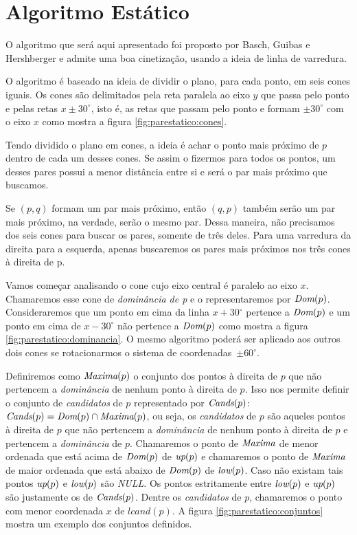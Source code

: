 
\FloatBarrier
\section{Algoritmo Estático}

O algoritmo que será aqui apresentado foi proposto por Basch, Guibas
e Hershberger e admite uma boa cinetização, usando a ideia de linha
de varredura.

O algoritmo é baseado na ideia de dividir o plano, para cada ponto,
em seis cones iguais. Os cones são delimitados pela reta paralela ao
eixo $y$ que passa pelo ponto e pelas retas $x \pm 30^\circ$, isto
é, as retas que passam pelo ponto e formam $\pm 30^\circ$ com o eixo
$x$ como mostra a figura \ref{fig:parestatico:cones}.



Tendo dividido o plano em cones, a ideia é achar o ponto mais
próximo de $p$ dentro de cada um desses cones. Se assim o fizermos
para todos os pontos, um desses pares possui a menor distância entre
si e será o par mais próximo que buscamos.

Se $(p, q)$ formam um par mais próximo, então $(q, p)$ também serão
um par mais próximo, na verdade, serão o mesmo par. Dessa maneira,
não precisamos dos seis cones para buscar os pares, somente de três
deles. Para uma varredura da direita para a esquerda, apenas
buscaremos os pares mais próximos nos três cones à direita de p.

Vamos começar analisando o cone cujo eixo central é paralelo ao eixo
$x$. Chamaremos esse cone de \textit{dominância de p} e o
representaremos por $\textit{Dom}(p)$. Consideraremos que um ponto em cima
da linha $x + 30^\circ$ pertence a $\textit{Dom}(p)$ e um ponto em cima de
$x - 30^\circ$ não pertence a $\textit{Dom}(p)$ como mostra a figura
\ref{fig:parestatico:dominancia}. O mesmo algoritmo poderá ser
aplicado aos outros dois cones se rotacionarmos o sistema de
coordenadas~$\pm 60^\circ$.



Definiremos como $\textit{Maxima}(p)$ o conjunto dos pontos à direita de $p$
que não pertencem a \textit{dominância} de nenhum ponto à direita de
$p$. Isso nos permite definir o conjunto de \textit{candidatos} de
$p$ representado por $\textit{Cands}(p)$: $\textit{Cands}(p) = \textit{Dom}(p) \cap
\textit{Maxima}(p)$, ou seja, os \textit{candidatos} de $p$ são aqueles
pontos à direita de $p$ que não pertencem a \textit{dominância} de
nenhum ponto à direita de $p$ e pertencem a \textit{dominância} de
$p$. Chamaremos o ponto de $\textit{Maxima}$ de menor ordenada que está
acima de $\textit{Dom}(p)$ de $\textit{up}(p)$ e chamaremos o ponto de $\textit{Maxima}$ de
maior ordenada que está abaixo de $\textit{Dom}(p)$ de $\textit{low}(p)$. Caso não
existam tais pontos $\textit{up}(p)$ e $\textit{low}(p)$ são \textit{NULL}. Os
pontos estritamente entre $\textit{low}(p)$ e $\textit{up}(p)$ são justamente os de
$\textit{Cands}(p)$. Dentre os \textit{candidatos} de $p$, chamaremos o
ponto com menor coordenada $x$ de $lcand(p)$. A figura
\ref{fig:parestatico:conjuntos}
mostra um exemplo dos conjuntos definidos.

